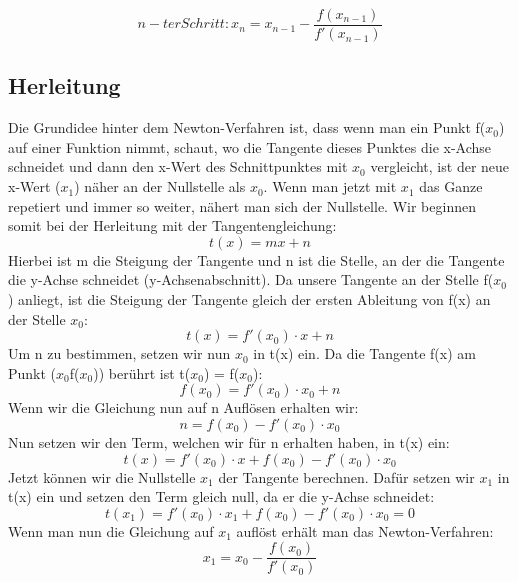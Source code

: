 \documentclass[a4paper,12pt]{report}
\begin{document}
\begin{equation*}
n-ter Schritt: x_n = x_{n-1} - \frac{f(x_{n-1})}{f'(x_{n-1})}
\end{equation*}

\subsection{Herleitung}
Die Grundidee hinter dem Newton-Verfahren ist, dass wenn man ein Punkt f($x_0$) auf einer Funktion nimmt, schaut, wo die Tangente dieses Punktes die x-Achse schneidet und dann den x-Wert des Schnittpunktes mit $x_0$ vergleicht, ist der neue x-Wert ($x_1$) näher an der Nullstelle als $x_0$. Wenn man jetzt mit $x_1$ das Ganze repetiert und immer so weiter,  nähert man sich der Nullstelle. Wir beginnen somit bei der Herleitung mit der Tangentengleichung:
 \begin{equation}
t(x) = mx + n
\end{equation}
Hierbei ist m die Steigung der Tangente und n ist die Stelle, an der die Tangente die y-Achse schneidet (y-Achsenabschnitt). Da unsere Tangente an der Stelle f($x_0$) anliegt, ist die Steigung der Tangente gleich der ersten Ableitung von f(x) an der Stelle $x_0$:
 \begin{equation}
t(x) = f'(x_0) \cdot  x + n
\end{equation}
Um n zu bestimmen, setzen wir nun $x_0$ in t(x) ein. Da die Tangente f(x) am Punkt ($x_0$\big \vert f($x_0$)) berührt ist t($x_0$) = f($x_0$):
 \begin{equation}
f(x_0) = f'(x_0) \cdot x_0 + n
\end{equation}
Wenn wir die Gleichung nun auf n Auflösen erhalten wir: 
\begin{equation}
n = f(x_0) -  f'(x_0) \cdot x_0
\end{equation}
Nun setzen wir den Term, welchen wir für n erhalten haben, in t(x) ein: 
 \begin{equation}
t(x) =  f'(x_0) \cdot x + f(x_0) -  f'(x_0) \cdot x_0
\end{equation}
Jetzt können wir die Nullstelle $x_1$ der Tangente berechnen. Dafür setzen wir $x_1$ in t(x) ein und setzen den Term gleich null, da er die y-Achse schneidet: 
 \begin{equation}
t(x_1) =  f'(x_0) \cdot x_1 + f(x_0) -  f'(x_0) \cdot x_0 = 0 
\end{equation}
Wenn man nun die Gleichung auf $x_1$ auflöst erhält man das Newton-Verfahren: 
\begin{equation}
x_1 = x_0 - \frac{f(x_0)}{f'(x_0)}
\end{equation}
\end{document}
